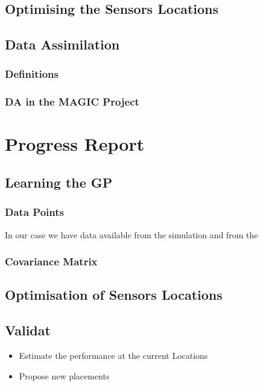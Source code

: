 \documentclass[11pt,a4paper]{article}
\numberwithin{equation}{section}
\begin{document}
\subsection{Optimising the Sensors Locations}

\subsection{Data Assimilation}

\subsubsection{Definitions}

\subsubsection{DA in the MAGIC Project}

\section{Progress Report}

\subsection{Learning the GP}
\subsubsection{Data Points }
In our case we have data available from the simulation and from the 

\subsubsection{Covariance Matrix}


\subsection{Optimisation of Sensors Locations}

\subsection{Validat}

\begin{itemize}
	\item Estimate the performance at the current Locations
	\item Propose new placements 
\end{itemize}
\end{document}
